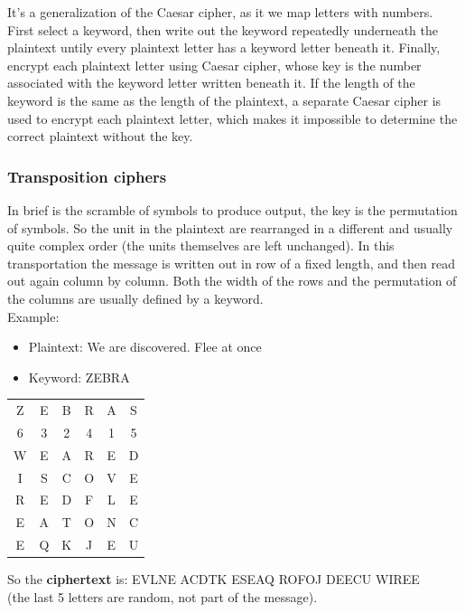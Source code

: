     It's a generalization of the Caesar cipher, as it we map letters with numbers. First select a keyword, then write out the keyword repeatedly underneath the plaintext untily every plaintext letter has a keyword letter beneath it. Finally, encrypt each plaintext letter using Caesar cipher, whose key is the number associated with the keyword letter written beneath it. 
    If the length of the keyword is the same as the length of the plaintext, a separate Caesar cipher is used to encrypt each plaintext letter, which makes it impossible to determine the correct plaintext without the key.
    
    \subsubsection{Transposition ciphers}
    In brief is the scramble of symbols to produce output, the key is the permutation of symbols. So the unit in the plaintext are rearranged in a different and usually quite complex order (the units themselves are left unchanged).
    In this transportation the message is written out in row of a fixed length, and then read out again column by column. Both the width of the rows and the permutation of the columns are usually defined by a keyword.
    \\Example:      
    \begin{itemize}
        \item Plaintext: We are discovered. Flee at once
        \item Keyword: ZEBRA
    \end{itemize}
    \begin{table}[h!]
        \centering
        \begin{tabular}{c c c c c c}
            Z & E & B & R & A & S\\
            6 & 3 & 2 & 4 & 1 & 5\\
            W & E & A & R & E & D\\
            I & S & C & O & V & E\\
            R & E & D & F & L & E\\
            E & A & T & O & N & C\\
            E & Q & K & J & E & U\\
        \end{tabular}
    \end{table}
   
    So the \textbf{ciphertext} is: EVLNE ACDTK ESEAQ ROFOJ DEECU WIREE
    \\(the last 5 letters are random, not part of the message).
    
